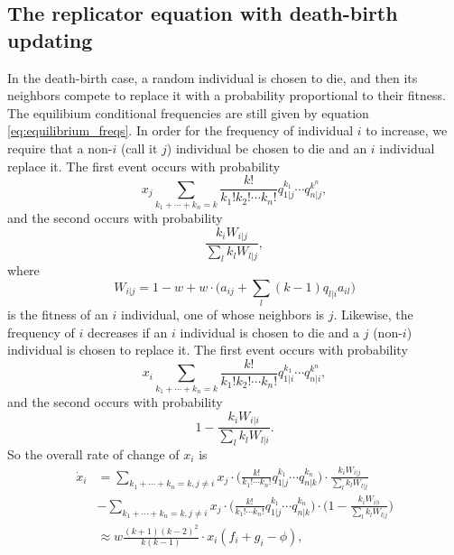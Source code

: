 \documentclass[14pt, justified]{tufte-handout}
\begin{document}
\subsection{The replicator equation with death-birth updating}

In the death-birth case, a random individual is chosen to die, and then its neighbors compete to replace it with a probability proportional to their fitness.
The equilibium conditional frequencies are still given by equation \ref{eq:equilibrium_freqs}.
In order for the frequency of individual $i$ to increase, we require that a non-$i$ (call it $j$) individual be chosen to die and an $i$ individual replace it.
The first event occurs with probability
\begin{equation}
    x_j \sum_{k_1 + \cdots + k_n = k}\frac{k!}{k_1! k_2! \cdots k_n!} q_{1|j}^{k_1} \cdots q_{n|j}^{k^n},
\end{equation}
and the second occurs with probability
\begin{equation}
    \frac{k_i W_{i|j}}{\sum_l k_l W_{l|j}},
\end{equation}
where
\begin{equation}
    W_{i|j} = 1 - w + w \cdot \Big( a_{ij} + \sum_l (k-1) q_{l|i} a_{il} \Big)
\end{equation}
is the fitness of an $i$ individual, one of whose neighbors is $j$.
Likewise, the frequency of $i$ decreases if an $i$ individual is chosen to die and a $j$ (non-$i$) individual is chosen to replace it.
The first event occurs with probability
\begin{equation}
    x_i \sum_{k_1 + \cdots + k_n = k}\frac{k!}{k_1! k_2! \cdots k_n!} q_{1|i}^{k_1} \cdots q_{n|i}^{k^n},
\end{equation}
and the second occurs with probability
\begin{equation}
    1 - \frac{k_i W_{i|i}}{\sum_l k_l W_{l|i}}.
\end{equation}
So the overall rate of change of $x_i$ is
\begin{equation}
    \begin{split}
        \dot{x}_i & = \sum_{k_1 + \cdots + k_n = k, j \neq i } x_j \cdot \Big( \frac{k!}{k_1! \cdots k_n!} q_{1|j}^{k_1} \cdots q_{n|k}^{k_n} \Big) \cdot \frac{k_i W_{i|j}}{\sum_l k_l W_{l|j}}
        \\
        & - \sum_{k_1 + \cdots + k_n = k, j \neq i } x_j \cdot \Big( \frac{k!}{k_1! \cdots k_n!} q_{1|j}^{k_1} \cdots q_{n|k}^{k_n} \Big) \cdot \Big( 1- \frac{k_i W_{i|i}}{\sum_l k_l W_{l|j}} \Big)
        \\
        & \approx w \frac{(k+1)(k-2)^2}{k (k-1)} \cdot x_i (f_i + g_i - \phi),
    \end{split}
    \label{eq:db_replicator}
\end{equation}
\end{document}
